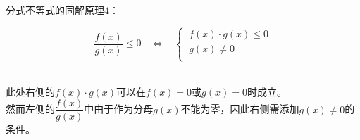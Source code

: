 \documentclass[UTF8]{ctexart}
\begin{document}
    分式不等式的同解原理$4$：
    \begin{large}
        \begin{equation*}
            \frac{f(x)}{g(x)}\leq 0~~~~\Longleftrightarrow~~~~
            \begin{cases}
                ~f(x)\cdot g(x)\leq 0\\[1mm]
                ~g(x)\neq 0\\
            \end{cases}
        \end{equation*}
    \end{large}\\
    此处右侧的$f(x)\cdot g(x)$可以在$f(x)=0$或$g(x)=0$时成立。\\[5mm]
    然而左侧的$\dfrac{f(x)}{g(x)}$中由于作为分母$g(x)$不能为零，因此右侧需添加$g(x)\neq 0$的条件。

\newpage
\end{document}
